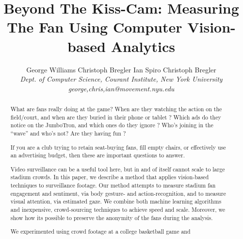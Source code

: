 \documentclass[times, 10pt,twocolumn]{article}
\begin{document}
\title{Beyond The Kiss-Cam: Measuring The Fan Using Computer Vision-based Analytics}

\author{George Williams  \hspace{0.1in} Christoph Bregler \hspace{0.1in} Ian Spiro \hspace{0.1in} Christoph Bregler \\
\emph{Dept. of Computer Science, Courant Institute, New York University}\\
\emph{george,chris,ian@movement.nyu.edu}\\
}

\maketitle
\thispagestyle{empty}

\begin{abstract}
What are fans really doing at the game?  When are they watching the action on the field/court, and when are they buried in their phone or tablet ?  Which ads do they notice on the JumboTron, and which ones do they ignore ?  Who’s joining in the “wave” and who’s not?  Are they having fun ?

If you are a club trying to retain seat-buying fans, fill empty chairs, or effectively use an advertising budget, then these are important questions to answer.

Video surveillance can be a useful tool here, but in and of itself cannot scale to large stadium crowds.  In this paper, we describe a method that applies vision-based techniques to surveillance footage.  Our method attempts to measure stadium fan engagement and sentiment, via body gesture- and action-recognition, and to measure visual attention, via estimated gaze.  We combine both machine learning algorithms and inexpensive, crowd-sourcing techniques to achieve speed and scale.  Moreover, we show how its possible to preserve the anonymity of the fans during the analysis.

We experimented using crowd footage at a college basketball game and 
\end{abstract}
\end{document}
